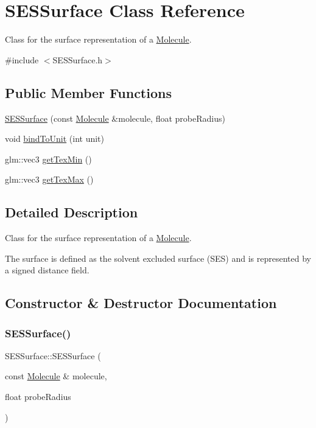 \hypertarget{class_s_e_s_surface}{}\section{S\+E\+S\+Surface Class Reference}
\label{class_s_e_s_surface}


Class for the surface representation of a \mbox{\hyperlink{struct_molecule}{Molecule}}.  




{\ttfamily \#include $<$S\+E\+S\+Surface.\+h$>$}

\subsection*{Public Member Functions}
\begin{DoxyCompactItemize}
\item 
\mbox{\hyperlink{class_s_e_s_surface_aed99335bed2c0a10c3addfd4fa06a312}{S\+E\+S\+Surface}} (const \mbox{\hyperlink{struct_molecule}{Molecule}} \&molecule, float probe\+Radius)
\item 
void \mbox{\hyperlink{class_s_e_s_surface_af5a7ed60365486cd63a9ad09b0d7ef8a}{bind\+To\+Unit}} (int unit)
\item 
glm\+::vec3 \mbox{\hyperlink{class_s_e_s_surface_ae287cb897484575889d57674814b9d21}{get\+Tex\+Min}} ()
\item 
glm\+::vec3 \mbox{\hyperlink{class_s_e_s_surface_aa133f4b102219bb8de92e4eb7d8e4660}{get\+Tex\+Max}} ()
\end{DoxyCompactItemize}


\subsection{Detailed Description}
Class for the surface representation of a \mbox{\hyperlink{struct_molecule}{Molecule}}. 

The surface is defined as the solvent excluded surface (S\+ES) and is represented by a signed distance field. 

\subsection{Constructor \& Destructor Documentation}
\mbox{\label{class_s_e_s_surface_aed99335bed2c0a10c3addfd4fa06a312}} 
\subsubsection{\texorpdfstring{SESSurface()}{SESSurface()}}
{\footnotesize\ttfamily S\+E\+S\+Surface\+::\+S\+E\+S\+Surface (\begin{DoxyParamCaption}\item[{const \mbox{\hyperlink{struct_molecule}{Molecule}} \&}]{molecule,  }\item[{float}]{probe\+Radius }\end{DoxyParamCaption})}

